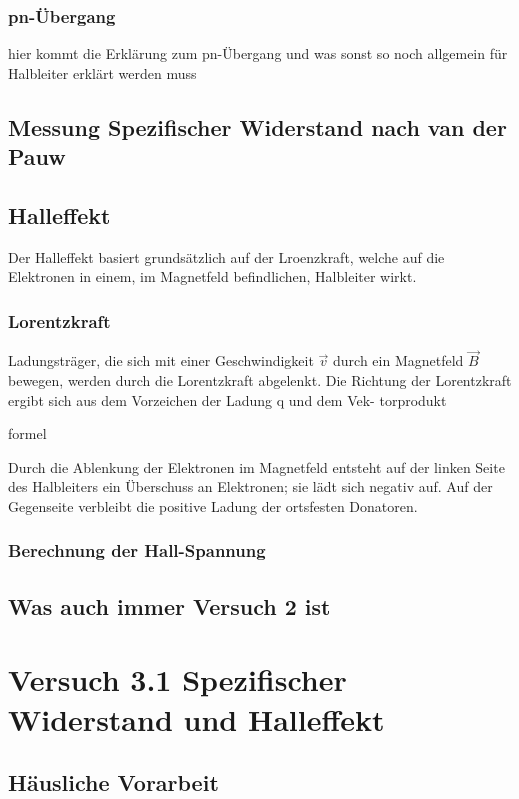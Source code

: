 \documentclass[a4paper]{scrartcl}
\numberwithin{equation}{subsection}
\begin{document}
\subsubsection{pn-Übergang}
hier kommt die Erklärung zum pn-Übergang und was sonst so noch allgemein für Halbleiter erklärt werden muss

\subsection{Messung Spezifischer Widerstand nach van der Pauw}

\subsection{Halleffekt}
Der Halleffekt basiert grundsätzlich auf der Lroenzkraft, welche auf die Elektronen in einem, im Magnetfeld befindlichen, Halbleiter wirkt.

\subsubsection{Lorentzkraft}
Ladungsträger, die sich mit einer Geschwindigkeit $\overrightarrow{v}$ durch ein Magnetfeld $\overrightarrow{B}$ bewegen, werden
durch die Lorentzkraft abgelenkt. 
Die Richtung der Lorentzkraft ergibt sich aus dem Vorzeichen der Ladung q und dem Vek-
torprodukt

formel

Durch die Ablenkung der Elektronen im Magnetfeld entsteht auf der linken Seite des Halbleiters
ein Überschuss an Elektronen; sie lädt sich negativ auf. Auf der Gegenseite verbleibt die positive
Ladung der ortsfesten Donatoren. 

\subsubsection{Berechnung der Hall-Spannung}

\subsection{Was auch immer Versuch 2 ist}

\newpage

\section{Versuch 3.1 Spezifischer Widerstand und Halleffekt}
\subsection{Häusliche Vorarbeit}
\end{document}
